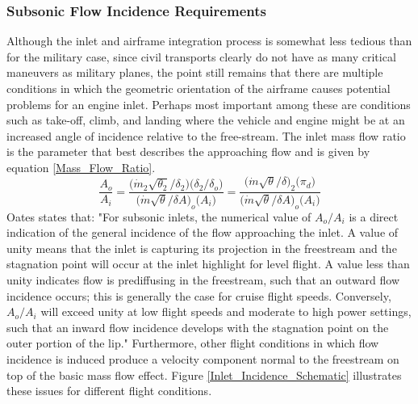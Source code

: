\documentclass[12pt]{gatech-thesis}
\begin{document}
\subsubsection{Subsonic Flow Incidence Requirements}
\indent Although the inlet and airframe integration process is somewhat less tedious than for the military case, since civil transports clearly do not have as many critical maneuvers as military planes, the point still remains that there are multiple conditions in which the geometric orientation of the airframe causes potential problems for an engine inlet.  Perhaps most important among these are conditions such as take-off, climb, and landing where the vehicle and engine might be at an increased angle of incidence relative to the free-stream.  The inlet mass flow ratio is the parameter that best describes the approaching flow and is given by equation \ref{Mass_Flow_Ratio}.
\begin{equation}
	\frac{A_o}
	        {A_i} = \frac{\Big(\dot{m}_2 \sqrt{\theta_2}/\delta_2\Big)\Big(\delta_2/\delta_o\Big)}{\Big(\dot{m}\sqrt{\theta}/\delta A\Big)_o\Big(A_i\Big)} = \frac{\Big(\dot{m}\sqrt{\theta}/\delta\Big)_2\Big(\pi_d\Big)}{\Big(\dot{m}\sqrt{\theta}/\delta A\Big)_o\Big(A_i\Big)}
			       {}
\label{Mass_Flow_Ratio}\end{equation}%
\indent Oates states that:  "For subsonic inlets, the numerical value of $A_o/A_i$ is a direct indication of the general incidence of the flow approaching the inlet.  A value of unity means that the inlet is capturing its projection in the freestream and the stagnation point will occur at the inlet highlight for level flight.  A value less than unity indicates flow is prediffusing in the freestream, such that an outward flow incidence occurs; this is generally the case for cruise flight speeds.  Conversely,$A_o/A_i$ will exceed unity at low flight speeds and moderate to high power settings, such that an inward flow incidence develops with the stagnation point on the outer portion of the lip."  Furthermore, other flight conditions in which flow incidence is induced produce a velocity component normal to the freestream on top of the basic mass flow effect.   Figure \ref{Inlet_Incidence_Schematic} illustrates these issues \cite{Oates1989} for different flight conditions.
\end{document}
